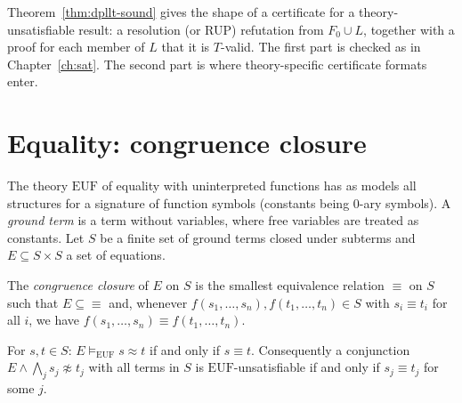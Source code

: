 Theorem~\ref{thm:dpllt-sound} gives the shape of a certificate for a theory-unsatisfiable result: a resolution (or RUP) refutation from $F_0\cup L$, together with a proof for each member of $L$ that it is $T$-valid. The first part is checked as in Chapter~\ref{ch:sat}. The second part is where theory-specific certificate formats enter.

\section{Equality: congruence closure}
\label{sec:cc}

The theory $\mathrm{EUF}$ of equality with uninterpreted functions has as models all structures for a signature of function symbols (constants being $0$-ary symbols). A \emph{ground term} is a term without variables, where free variables are treated as constants. Let $S$ be a finite set of ground terms closed under subterms and $E\subseteq S\times S$ a set of equations.

\begin{definition}
\label{def:cc}
The \emph{congruence closure} of $E$ on $S$ is the smallest equivalence relation $\equiv$ on $S$ such that $E\subseteq{\equiv}$ and, whenever $f(s_1,\dots,s_n),f(t_1,\dots,t_n)\in S$ with $s_i\equiv t_i$ for all $i$, we have $f(s_1,\dots,s_n)\equiv f(t_1,\dots,t_n)$.
\end{definition}

\begin{theorem}
\label{thm:cc}
For $s,t\in S$: $E\models_{\mathrm{EUF}}s\approx t$ if and only if $s\equiv t$. Consequently a conjunction $E\wedge\bigwedge_j s_j\not\approx t_j$ with all terms in $S$ is $\mathrm{EUF}$-unsatisfiable if and only if $s_j\equiv t_j$ for some $j$.
\end{theorem}

